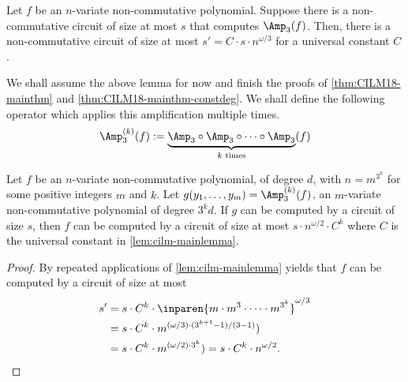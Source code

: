 \begin{lemma}\label{lem:cilm-mainlemma}
Let $f$ be an $n$-variate non-commutative polynomial. Suppose there is a non-commutative circuit of size at most $s$ that computes $\Amp_3(f)$. Then, there is a non-commutative circuit of size at most $s' = C \cdot s \cdot n^{\omega/3}$ for a universal constant $C$.
\end{lemma}
We shall assume the above lemma for now and finish the proofs of \autoref{thm:CILM18-mainthm} and \autoref{thm:CILM18-mainthm-constdeg}. We shall define the following operator which applies this amplification multiple times.
\[
  \Amp_3^{(k)}(f) := \underbrace{\Amp_3 \circ \Amp_3 \circ \cdots \circ \Amp_3}_{\text{$k$ times}} (f)
\]
\begin{corollary}\label{cor:cilm-maincorr}
  Let $f$ be an $n$-variate non-commutative polynomial, of degree $d$, with $n = m^{3^k}$ for some positive integers $m$ and $k$. Let $g(y_1,\ldots, y_m) = \Amp_3^{(k)}(f)$, an $m$-variate non-commutative polynomial of degree $3^k d$. If $g$ can be computed by a circuit of size $s$, then $f$ can be computed by a circuit of size at most $s \cdot n^{\omega/2}\cdot C^k$ where $C$ is the universal constant in \autoref{lem:cilm-mainlemma}.
\end{corollary}
\begin{proof}\belowdisplayskip=-12pt
  By repeated applications of \autoref{lem:cilm-mainlemma} yields that $f$ can be computed by a circuit of size at most
  \begin{align*}
    s' & = s \cdot C^k \cdot \inparen{m \cdot m^3 \cdot \cdots \cdot m^{3^k}}^{\omega/3}\\
       & = s \cdot C^k \cdot m^{(\omega/3) \cdot (3^{k+1} - 1)/(3 - 1)})\\
       & = s \cdot C^k \cdot m^{(\omega/2) \cdot 3^k}) = s \cdot C^k \cdot n^{\omega/2}.
  \end{align*}
\end{proof}

